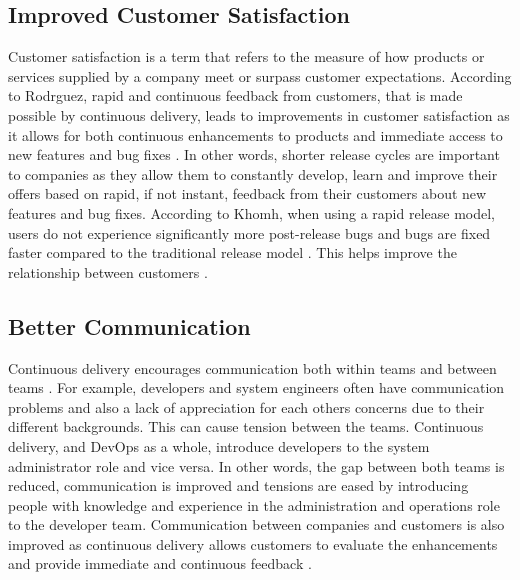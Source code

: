 \documentclass[10pt,journal,compsoc]{IEEEtran}
\begin{document}
\subsection{Improved Customer Satisfaction}
Customer satisfaction is a term that refers to the measure of how products or services supplied by a company meet or surpass customer expectations. According to Rodrguez, rapid and continuous feedback from customers, that is made possible by continuous delivery, leads to improvements in customer satisfaction as it allows for both continuous enhancements to products and immediate access to new features and bug fixes \cite{RODRIGUEZ2017263}. In other words, shorter release cycles are important to companies as they allow them to constantly develop, learn and improve their offers based on rapid, if not instant, feedback from their customers about new features and bug fixes. According to Khomh, when using a rapid release model, users do not experience significantly more post-release bugs and bugs are fixed faster compared to the traditional release model \cite{khomh2012faster}. This helps improve the relationship between customers \cite{chen2015continuous}.

\subsection{Better Communication}
Continuous delivery encourages communication both within teams and between teams \cite{staahl2013experienced}. For example, developers and system engineers often have communication problems and also a lack of appreciation for each others concerns due to their different backgrounds. This can cause tension between the teams. Continuous delivery, and DevOps as a whole, introduce developers to the system administrator role and vice versa. In other words, the gap between both teams is reduced, communication is improved and tensions are eased by introducing people with knowledge and experience in the administration and operations role to the developer team. Communication between companies and customers is also improved as continuous delivery allows customers to evaluate the enhancements and provide immediate and continuous feedback \cite{RODRIGUEZ2017263}.
\end{document}
